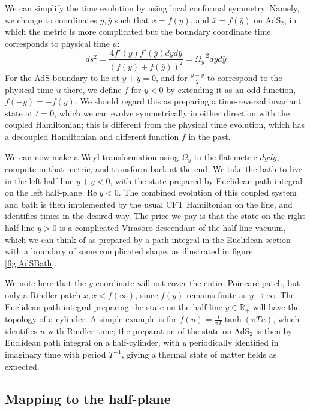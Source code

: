\documentclass[12pt]{article}
\renewcommand{\Re}{\operatorname{Re}}
\newcommand{\RR}{\mathbb{R}}
\begin{document}
We can simplify the time evolution by using local conformal symmetry. Namely, we change to coordinates $y,\bar{y}$ such that $x=f(y)$, and $\bar{x}=f(\bar{y})$ on AdS$_2$, in which the metric is more complicated but the boundary coordinate time corresponds to physical time $u$:
\begin{equation}\label{eq:yMetric}
	ds^2  = \frac{4f'(y)f'(\bar{y}) dyd\bar{y}}{(f(y)+f(\bar{y}))^2} = \Omega_y^{-2} dyd\bar{y}
\end{equation}
For the AdS boundary to lie at $y+\bar{y}=0$, and for $\frac{\bar{y}-y}{2}$ to correspond to the physical time $u$ there, we define $f$ for $y<0$ by extending it as an odd function, $f(-y)=-f(y)$. We should regard this as preparing a time-reversal invariant state at $t=0$, which we can evolve symmetrically in either direction with the coupled Hamiltonian; this is different from the physical time evolution, which has a decoupled Hamiltonian and different function $f$ in the past.

We can now make a Weyl transformation using $\Omega_y$ to the flat metric $dyd\bar{y}$, compute in that metric, and transform back at the end. We take the bath to live in the left half-line $y+\bar{y}<0$, with the state prepared by Euclidean path integral on the left half-plane $\Re y<0$. The combined evolution of this coupled system and bath is then implemented by the usual CFT Hamiltonian on the line, and identifies times in the desired way. The price we pay is that the state on the right half-line $y>0$ is a complicated Virasoro descendant of the half-line vacuum, which we can think of as prepared by a path integral in the Euclidean section with a boundary of some complicated shape, as illustrated in figure \ref{fig:AdSBath}.

We note here that the $y$ coordinate will not cover the entire Poincar\'e patch, but only a Rindler patch $x,\bar{x}<f(\infty)$, since $f(y)$ remains finite as $y\to\infty$. The Euclidean path integral preparing the state on the half-line $y\in \RR_+$ will have the topology of a cylinder. A simple example is for $f(u)=\frac{1}{\pi T}\tanh(\pi T u)$, which identifies $u$ with Rindler time; the preparation of the state on AdS$_2$ is then by Euclidean path integral on a half-cylinder, with $y$ periodically identified in imaginary time with period $T^{-1}$, giving a thermal state of matter fields as expected.


\subsection{Mapping to the half-plane}
\end{document}
